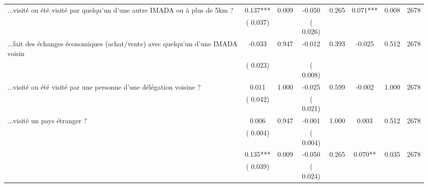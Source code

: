 \begin{tabular}{l*{7}{c}}
 ...visité ou été visité par quelqu'un d'une autre IMADA ou à plus de 5km ?       &              0.137***       &        0.009  &             -0.050       &        0.265  &              0.071***       &              0.008 &  2678 \\ 
                       &       (       0.037)             &                               &       (       0.026)                     &                               &                                               &                                &                      \\ 

 ...fait des échanges économiques (achat/vente) avec quelqu'un d'une IMADA voisin       &             -0.033       &        0.947  &             -0.012       &        0.393  &             -0.025       &              0.512 &  2678 \\ 
                       &       (       0.023)             &                               &       (       0.008)                     &                               &                                               &                                &                      \\ 

 ...visité ou été visité par une personne d'une délégation voisine ?       &              0.011       &        1.000  &             -0.025       &        0.599  &             -0.002       &              1.000 &  2678 \\ 
                       &       (       0.042)             &                               &       (       0.021)                     &                               &                                               &                                &                      \\ 

 ...visité un pays étranger ?       &              0.006       &        0.947  &             -0.001       &        1.000  &              0.003       &              0.512 &  2678 \\ 
                       &       (       0.004)             &                               &       (       0.004)                     &                               &                                               &                                &                      \\ 

        &              0.135***       &        0.009  &             -0.050       &        0.265  &              0.070**       &              0.035 &  2678 \\ 
                       &       (       0.039)             &                               &       (       0.024)                     &                               &                                               &                                &                      \\ 


\end{tabular}
